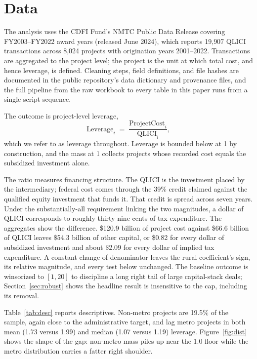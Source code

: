 \section{Data}\label{sec:data}

The analysis uses the CDFI Fund's NMTC Public Data Release covering
FY2003--FY2022 award years (released June 2024), which reports 19{,}907
QLICI transactions across 8{,}024 projects with origination years
2001--2022. Transactions are aggregated to the project level; the project
is the unit at which total cost, and hence leverage, is defined.
Cleaning steps, field definitions, and file hashes are documented in the
public repository's data dictionary and provenance files, and the full
pipeline from the raw workbook to every table in this paper runs from a
single script sequence.

The outcome is project-level leverage,
\[
\mathrm{Leverage}_i \;=\; \frac{\mathrm{ProjectCost}_i}{\mathrm{QLICI}_i},
\]
which we refer to as leverage throughout. Leverage is bounded below at 1 by
construction, and the mass at 1 collects projects whose recorded cost equals
the subsidized investment alone.

The ratio measures financing structure. The QLICI is the investment placed
by the intermediary; federal cost comes through the 39\% credit claimed
against the qualified equity investment that funds it. That credit is
spread across seven years. Under the substantially-all requirement linking
the two magnitudes, a dollar of QLICI corresponds to roughly thirty-nine
cents of tax expenditure. The aggregates show the difference. \$120.9
billion of project cost against \$66.6 billion of QLICI leaves \$54.3
billion of other capital, or \$0.82 for every dollar of subsidized
investment and about \$2.09 for every dollar of implied tax expenditure. A
constant change of denominator leaves the rural coefficient's sign, its
relative magnitude, and every test below unchanged. The baseline outcome is
winsorized to $[1, 20]$ to discipline a long right tail of large
capital-stack deals; Section~\ref{sec:robust} shows the headline result is
insensitive to the cap, including its removal.

Table~\ref{tab:desc} reports descriptives. Non-metro projects are 19.5\% of
the sample, again close to the administrative target, and lag metro projects in both
mean (1.73 versus 1.99) and median (1.07 versus 1.19) leverage.
Figure~\ref{fig:dist} shows the shape of the gap: non-metro mass piles up
near the 1.0 floor while the metro distribution carries a fatter right
shoulder.

